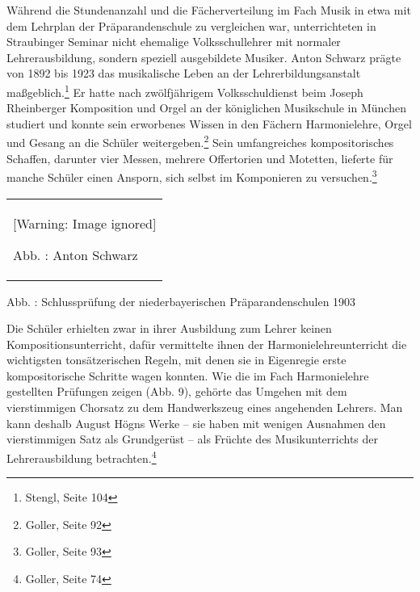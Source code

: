 \documentclass[a4paper]{article}
\newcounter{Abb}
\renewcommand\theAbb{\arabic{Abb}}
\begin{document}
Während die Stundenanzahl und die Fächerverteilung im Fach Musik in etwa
mit dem Lehrplan der Präparandenschule zu vergleichen war,
unterrichteten in Straubinger Seminar nicht ehemalige Volksschullehrer
mit normaler Lehrerausbildung, sondern speziell ausgebildete Musiker.
Anton Schwarz prägte von 1892 bis 1923 das musikalische Leben an der
Lehrerbildungsanstalt maßgeblich.\footnote{ Stengl, Seite 104} Er hatte
nach zwölfjährigem Volksschuldienst beim Joseph Rheinberger Komposition
und Orgel an der königlichen Musikschule in München studiert und konnte
sein erworbenes Wissen in den Fächern Harmonielehre, Orgel und Gesang
an die Schüler weitergeben.\footnote{ Goller, Seite 92} Sein
umfangreiches kompositorisches Schaffen, darunter vier Messen, mehrere
Offertorien und Motetten, lieferte für manche Schüler einen Ansporn,
sich selbst im Komponieren zu versuchen.\footnote{ Goller, Seite 93} 

\begin{center}
\begin{minipage}{4.269cm}
\begin{flushleft}
\tablefirsthead{}
\tablehead{}
\tabletail{}
\tablelasttail{}
\begin{supertabular}{m{4.0690002cm}}
  [Warning: Image ignored] %
 
Abb. \stepcounter{Abb}{\theAbb}: Anton Schwarz\\
\end{supertabular}
\end{flushleft}
\end{minipage}
\end{center}
{%
 \par}
{\centering
\label{bkm:Ref100298600}Abb. \stepcounter{Abb}{\theAbb}: Schlussprüfung
der niederbayerischen Präparandenschulen 1903
\par}

Die Schüler erhielten zwar in ihrer Ausbildung zum Lehrer keinen
Kompositionsunterricht, dafür vermittelte ihnen der
Harmonielehreunterricht die wichtigsten tonsätzerischen Regeln, mit
denen sie in Eigenregie erste kompositorische Schritte wagen konnten.
Wie die im Fach Harmonielehre gestellten Prüfungen zeigen (Abb. 9),
gehörte das Umgehen mit dem vierstimmigen Chorsatz zu dem Handwerkszeug
eines angehenden Lehrers. Man kann deshalb August Högns Werke – sie
haben mit wenigen Ausnahmen den vierstimmigen Satz als Grundgerüst –
als Früchte des Musikunterrichts der Lehrerausbildung
betrachten.\footnote{ Goller, Seite 74}
\end{document}
